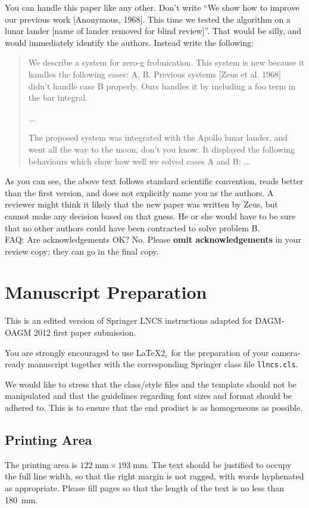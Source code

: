 \documentclass[runningheads]{llncs}
\begin{document}
You can handle this paper like any other.  Don't write ``We show how to
improve our previous work [Anonymous, 1968].  This time we tested the
algorithm on a lunar lander [name of lander removed for blind review]''.
That would be silly, and would immediately identify the authors. Instead
write the following:
\begin{quotation}
\noindent
   We describe a system for zero-g frobnication.  This
   system is new because it handles the following cases:
   A, B.  Previous systems [Zeus et al. 1968] didn't
   handle case B properly.  Ours handles it by including
   a foo term in the bar integral.

   ...

   The proposed system was integrated with the Apollo
   lunar lander, and went all the way to the moon, don't
   you know.  It displayed the following behaviours
   which show how well we solved cases A and B: ...
\end{quotation}
As you can see, the above text follows standard scientific convention,
reads better than the first version, and does not explicitly name you as
the authors.  A reviewer might think it likely that the new paper was
written by Zeus, but cannot make any decision based on that guess.
He or she would have to be sure that no other authors could have been
contracted to solve problem B. \\

\noindent FAQ: Are acknowledgements OK?  No. Please {\bf omit
acknowledgements} in your review copy; they can go in the final copy.



\section{Manuscript Preparation}
This is an edited version of Springer LNCS instructions adapted for
DAGM-OAGM 2012 first paper submission. 

You are strongly encouraged to use \LaTeX2$_\varepsilon$ for the
preparation of your
camera-ready manuscript together with the corresponding Springer
class file \verb+llncs.cls+.

We would like to stress that the class/style files and the template
should not be manipulated and that the guidelines regarding font sizes
and format should be adhered to. This is to ensure that the end product
is as homogeneous as possible.

\subsection{Printing Area}
The printing area is $122  \; \mbox{mm} \times 193 \;
\mbox{mm}$.
The text should be justified to occupy the full line width,
so that the right margin is not ragged, with words hyphenated as
appropriate. Please fill pages so that the length of the text
is no less than 180~mm.
\end{document}

